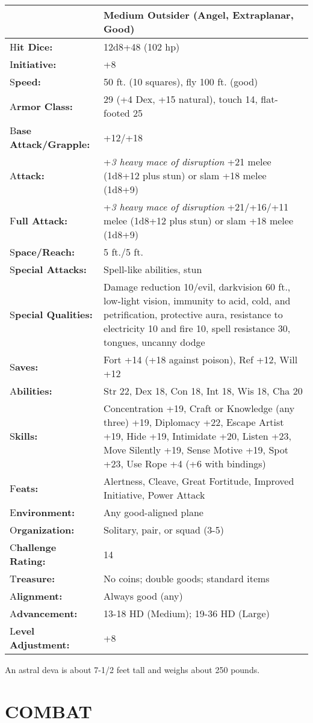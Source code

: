 \documentclass{article}
\begin{document}
\begin{tabular}{|>{\raggedright}p{91pt}|>{\raggedright}p{213pt}|}
\hline
  & Medium Outsider (Angel, Extraplanar, Good)\tabularnewline
\hline
H\textbf{it Dice:} & 12d8+48 (102 hp)\tabularnewline
\hline
I\textbf{nitiative:} & +8\tabularnewline
\hline
S\textbf{peed:} & 50 ft. (10 squares), fly 100 ft. (good)\tabularnewline
\hline
A\textbf{rmor Class:} & 29 (+4 Dex, +15 natural), touch 14, flat-footed 25\tabularnewline
\hline
B\textbf{ase Attack/Grapple:} & +12/+18\tabularnewline
\hline
A\textbf{ttack:} & +\textit{3 heavy mace of disruption }+21 melee (1d8+12 plus 
stun) or slam +18 melee (1d8+9)\tabularnewline
\hline
F\textbf{ull Attack:} & +\textit{3 heavy mace of disruption }+21/+16/+11 melee 
(1d8+12 plus stun) or slam +18 melee (1d8+9)\tabularnewline
\hline
S\textbf{pace/Reach:} & 5 ft./5 ft.\tabularnewline
\hline
S\textbf{pecial Attacks:} & Spell-like abilities, stun\tabularnewline
\hline
S\textbf{pecial Qualities:} & Damage reduction 10/evil, darkvision 60 ft., low-light 
vision, immunity to acid, cold, and petrification, protective aura, resistance 
to electricity 10 and fire 10, spell resistance 30, tongues, uncanny dodge\tabularnewline
\hline
S\textbf{aves:} & Fort +14 (+18 against poison), Ref +12, Will +12\tabularnewline
\hline
A\textbf{bilities:} & Str 22, Dex 18, Con 18, Int 18, Wis 18, Cha 20\tabularnewline
\hline
S\textbf{kills:} & Concentration +19, Craft or Knowledge (any three) +19, Diplomacy 
+22, Escape Artist +19, Hide +19, Intimidate +20, Listen +23, Move Silently +19, 
Sense Motive +19, Spot +23, Use Rope +4 (+6 with bindings)\tabularnewline
\hline
F\textbf{eats:} & Alertness, Cleave, Great Fortitude, Improved Initiative, Power 
Attack\tabularnewline
\hline
E\textbf{nvironment:} & Any good-aligned plane\tabularnewline
\hline
O\textbf{rganization:} & Solitary, pair, or squad (3-5)\tabularnewline
\hline
C\textbf{hallenge Rating:} & 14\tabularnewline
\hline
T\textbf{reasure:} & No coins; double goods; standard items\tabularnewline
\hline
A\textbf{lignment:} & Always good (any)\tabularnewline
\hline
A\textbf{dvancement:} & 13-18 HD (Medium); 19-36 HD (Large)\tabularnewline
\hline
L\textbf{evel Adjustment:} & +8\tabularnewline
\hline
\end{tabular}

An astral deva is about 7-1/2 feet tall and weighs about 250 pounds.

\section*{COMBAT}
\end{document}
